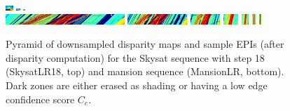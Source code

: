 \documentclass{article}
\theoremstyle{definition}
\begin{document}
\begin{figure}[th]
  \includegraphics[width=0.025\textwidth]{images/pyr/1521751973001_pyr_depth_004.png}
  \includegraphics[width=0.0125\textwidth]{images/pyr/1521751973001_pyr_depth_005.png}
  \includegraphics[width=0.00625\textwidth]{images/pyr/1521751973001_pyr_depth_006.png}\\
  \includegraphics[width=0.4\textwidth]{images/pyr/1521751973001_pyr_epi_000.png}
  \includegraphics[width=0.2\textwidth]{images/pyr/1521751973001_pyr_epi_001.png}
  \includegraphics[width=0.1\textwidth]{images/pyr/1521751973001_pyr_epi_002.png}
  \includegraphics[width=0.05\textwidth]{images/pyr/1521751973001_pyr_epi_003.png}
  \includegraphics[width=0.025\textwidth]{images/pyr/1521751973001_pyr_epi_004.png}
  \includegraphics[width=0.0125\textwidth]{images/pyr/1521751973001_pyr_epi_005.png}
  \includegraphics[width=0.00625\textwidth]{images/pyr/1521751973001_pyr_epi_006.png}
  \caption{Pyramid of downsampled disparity maps and sample EPIs (after disparity computation) for the Skysat sequence with step 18 (SkysatLR18, top) and mansion sequence (MansionLR, bottom). Dark zones are either erased as shading or having a low edge confidence score $C_e$.}
  \label{fig:pyramid}
\end{figure}
\end{document}
